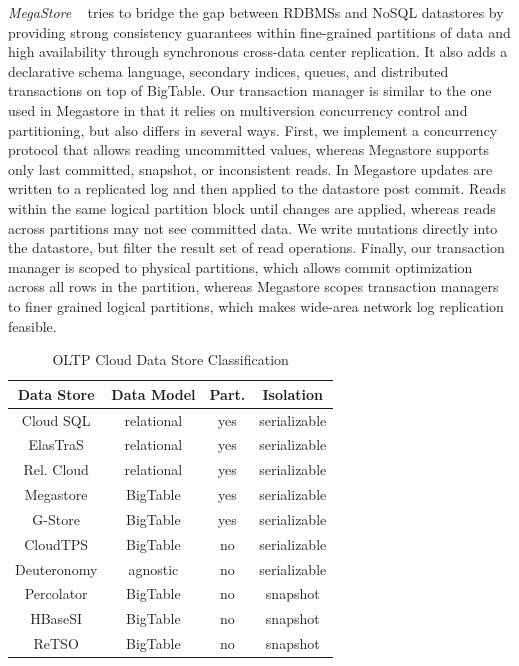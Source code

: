 \documentclass[10pt,final,journal]{IEEEtran}
\begin{document}
\emph{MegaStore} ~\cite{Furman:2008:8530095, Baker:2011:8530095} tries to bridge the gap between RDBMSs and NoSQL datastores by providing strong consistency guarantees within fine-grained partitions of data and high availability through synchronous cross-data center replication. It also adds a declarative schema language, secondary indices, queues, and distributed transactions on top of BigTable. Our transaction manager is similar to the one used in Megastore in that it relies on multiversion concurrency control and partitioning, but also differs in several ways. First, we implement a concurrency protocol that allows reading uncommitted values, whereas Megastore supports only last committed, snapshot, or inconsistent reads. In Megastore updates are written to a replicated log and then applied to the datastore post commit. Reads within the same logical partition block until changes are applied, whereas reads across partitions may not see committed data. We write mutations directly into the datastore, but filter the result set of read operations. Finally, our transaction manager is scoped to physical partitions, which allows commit optimization across all rows in the partition, whereas Megastore scopes transaction managers to finer grained logical partitions, which makes wide-area network log replication feasible.

\begin{table}[!t]
\renewcommand{\arraystretch}{1.3}
\caption{OLTP Cloud Data Store Classification}
\label{classification}
\centering
\begin{tabular}{|c|c|c|c|}
\hline
\bfseries Data Store  & \bfseries Data Model & \bfseries  Part. & \bfseries Isolation \\
\hline
\hline
Cloud SQL & relational & yes & serializable \\
ElasTraS & relational & yes & serializable \\
Rel. Cloud & relational & yes & serializable \\
Megastore & BigTable & yes & serializable \\
G-Store & BigTable & yes & serializable \\
CloudTPS & BigTable & no & serializable \\
Deuteronomy & agnostic & no &serializable \\
Percolator & BigTable & no & snapshot \\
HBaseSI & BigTable & no & snapshot \\
ReTSO & BigTable & no & snapshot \\
\hline
\end{tabular}
\end{table}
\end{document}
